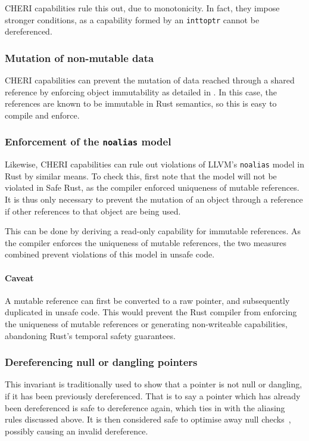 \documentclass[dissertation.tex]{subfiles}
\begin{document}
CHERI capabilities rule this out, due to monotonicity.
In fact, they impose stronger conditions, as a capability formed by an
\texttt{inttoptr} cannot be dereferenced.

\subsubsection{Mutation of non-mutable data}
CHERI capabilities can prevent the mutation of data reached through a
shared reference by enforcing object immutability as detailed in
.
In this case, the references are known to be immutable in Rust
semantics, so this is easy to compile and enforce.

\subsubsection{Enforcement of the \texttt{noalias} model}
Likewise, CHERI capabilities can rule out violations of LLVM's
\texttt{noalias} model in Rust by similar means.
To check this, first note that the model will not be violated in Safe
Rust, as the compiler enforced uniqueness of mutable references.
It is thus only necessary to prevent the mutation of an object through a
reference if other references to that object are being used.

This can be done by deriving a read-only capability for immutable
references.
As the compiler enforces the uniqueness of mutable references, the two
measures combined prevent violations of this model in unsafe code.

\paragraph{Caveat}
A mutable reference can first be converted to a raw pointer, and
subsequently duplicated in unsafe code.
This would prevent the Rust compiler from enforcing the uniqueness of
mutable references or generating non-writeable capabilities, abandoning
Rust's temporal safety guarantees.

\subsubsection{Dereferencing null or dangling pointers}
This invariant is traditionally used to show that a pointer is not
null or dangling, if it has been previously dereferenced.
That is to say a pointer which has already been dereferenced is safe to
dereference again, which ties in with the aliasing rules discussed
above.
It is then considered safe to optimise away null
checks~\cite{wang2013towards,llvm-undef-dce}, possibly causing an
invalid dereference.
\end{document}
